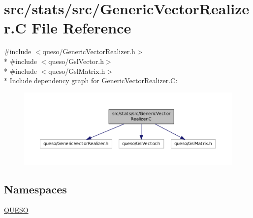 \hypertarget{_generic_vector_realizer_8_c}{\section{src/stats/src/\-Generic\-Vector\-Realizer.C File Reference}
\label{_generic_vector_realizer_8_c}
}
{\ttfamily \#include $<$queso/\-Generic\-Vector\-Realizer.\-h$>$}\\*
{\ttfamily \#include $<$queso/\-Gsl\-Vector.\-h$>$}\\*
{\ttfamily \#include $<$queso/\-Gsl\-Matrix.\-h$>$}\\*
Include dependency graph for Generic\-Vector\-Realizer.\-C\-:
\nopagebreak
\begin{figure}[H]
\begin{center}
\leavevmode
\includegraphics[width=350pt]{_generic_vector_realizer_8_c__incl}
\end{center}
\end{figure}
\subsection*{Namespaces}
\begin{DoxyCompactItemize}
\item 
\hyperlink{namespace_q_u_e_s_o}{Q\-U\-E\-S\-O}
\end{DoxyCompactItemize}
